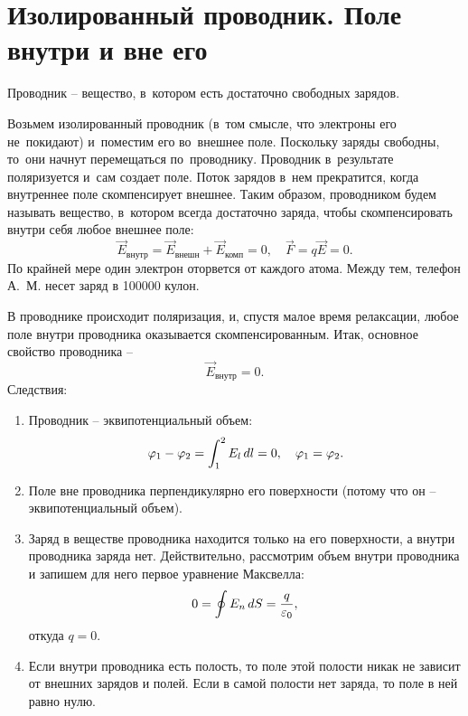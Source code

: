 \section{Изолированный проводник. Поле внутри и вне его}
	
	Проводник -- вещество, в~котором есть достаточно свободных зарядов. \par
	Возьмем изолированный проводник (в~том смысле, что электроны его не~покидают) и~поместим его во~внешнее поле. Поскольку заряды свободны, то~они начнут перемещаться по~проводнику. Проводник в~результате поляризуется и~сам создает поле. Поток зарядов в~нем прекратится, когда внутреннее поле скомпенсирует внешнее. Таким образом, проводником будем называть вещество, в~котором всегда достаточно заряда, чтобы скомпенсировать внутри себя любое внешнее поле:
		$$\vec{E}_{\text{внутр}}=\vec{E}_{\text{внешн}}+\vec{E}_{\text{комп}}=0, \quad \vec{F}=q\vec{E}=0.$$
	По крайней мере один электрон оторвется от каждого атома. Между тем, телефон А.~М. несет заряд в 100000 кулон. \par
	В проводнике происходит поляризация, и, спустя малое время релаксации, любое поле внутри проводника оказывается скомпенсированным. Итак, основное свойство проводника --
		\begin{equation}
			\vec{E}_{\text{внутр}}=0.
		\end{equation}
	Следствия:
		\begin{enumerate}
			\item Проводник -- эквипотенциальный объем:
					$$\varphi_1-\varphi_2=\int_1^2 E_l\,d l=0, \quad \varphi_1=\varphi_2.$$
			\item Поле вне проводника перпендикулярно его поверхности (потому что он -- эквипотенциальный объем).
			\item Заряд в веществе проводника находится только на его поверхности, а внутри проводника заряда нет. Действительно, рассмотрим объем внутри проводника и запишем для него первое уравнение Максвелла:
				$$0=\oint E_n\,d S=\frac{q}{\varepsilon_0},$$
			откуда $q=0$.
			\item Если внутри проводника есть полость, то поле этой полости никак не зависит от внешних зарядов и полей. Если в самой полости нет заряда, то поле в ней равно нулю.
		\end{enumerate}